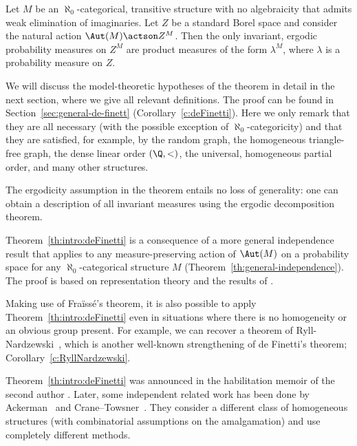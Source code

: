 \begin{theorem}
\label{th:intro:deFinetti}
Let $M$ be an $\aleph_0$-categorical, transitive structure with no algebraicity that admits weak elimination of imaginaries. Let $Z$ be a standard Borel space and consider the natural action $\Aut(M) \actson Z^M$. Then the only invariant, ergodic probability measures on $Z^M$ are product measures of the form $\lambda^M$, where $\lambda$ is a probability measure on $Z$.
\end{theorem}
We will discuss the model-theoretic hypotheses of the theorem in detail in the next section, where we give all relevant definitions. The proof can be found in Section~\ref{sec:general-de-finett} (\cf Corollary~\ref{c:deFinetti}). Here we only remark that they are all necessary (with the possible exception of $\aleph_0$-categoricity) and that they are satisfied, for example, by the random graph, the homogeneous triangle-free graph, the dense linear order $(\Q, <)$, the universal, homogeneous partial order, and many other structures.

The ergodicity assumption in the theorem entails no loss of generality: one can obtain a description of all invariant measures using the ergodic decomposition theorem.

Theorem~\ref{th:intro:deFinetti} is a consequence of a more general independence result that applies to any measure-preserving action of $\Aut(M)$ on a probability space for any $\aleph_0$-categorical structure $M$ (\cf Theorem~\ref{th:general-independence}). The proof is based on representation theory and the results of \cite{Tsankov2012}.

Making use of Fraïssé's theorem, it is also possible to apply Theorem~\ref{th:intro:deFinetti} even in situations where there is no homogeneity or an obvious group present. For example, we can recover a theorem of Ryll-Nardzewski~\cite{RyllNardzewski1957}, which is another well-known strengthening of de Finetti's theorem; \cf Corollary~\ref{c:RyllNardzewski}.

Theorem~\ref{th:intro:deFinetti} was announced in the habilitation memoir of the second author \cite{Tsankov2014}. Later, some independent related work has been done by Ackerman~\cite{Ackerman2015p} and Crane--Towsner~\cite{Crane2018}. They consider a different class of homogeneous structures (with combinatorial assumptions on the amalgamation) and use completely different methods.\enlargethispage{.5\baselineskip}%

